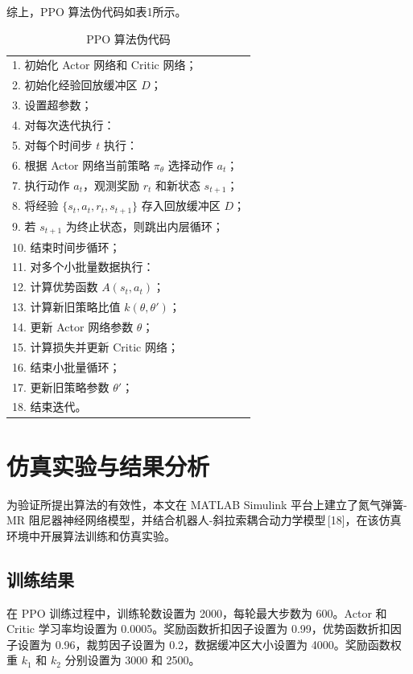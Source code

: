 \documentclass[12pt,a4paper]{ctexart}
\begin{document}
综上，PPO 算法伪代码如表1所示。

\begin{longtable}{p{}}
\caption{PPO 算法伪代码}\\
\toprule
1. 初始化 Actor 网络和 Critic 网络；\\
2. 初始化经验回放缓冲区 $D$；\\
3. 设置超参数；\\
4. 对每次迭代执行：\\
5. \quad 对每个时间步 $t$ 执行：\\
6. \quad\quad 根据 Actor 网络当前策略 $\pi_\theta$ 选择动作 $a_t$；\\
7. \quad\quad 执行动作 $a_t$，观测奖励 $r_t$ 和新状态 $s_{t+1}$；\\
8. \quad\quad 将经验 $\{s_t,a_t,r_t,s_{t+1}\}$ 存入回放缓冲区 $D$；\\
9. \quad\quad 若 $s_{t+1}$ 为终止状态，则跳出内层循环；\\
10. \quad 结束时间步循环；\\
11. \quad 对多个小批量数据执行：\\
12. \quad\quad 计算优势函数 $A(s_t,a_t)$；\\
13. \quad\quad 计算新旧策略比值 $k(\theta,\theta')$；\\
14. \quad\quad 更新 Actor 网络参数 $\theta$；\\
15. \quad\quad 计算损失并更新 Critic 网络；\\
16. \quad 结束小批量循环；\\
17. \quad 更新旧策略参数 $\theta'$；\\
18. 结束迭代。\\
\bottomrule
\end{longtable}

\section{仿真实验与结果分析}
为验证所提出算法的有效性，本文在 MATLAB Simulink 平台上建立了氮气弹簧-MR 阻尼器神经网络模型，并结合机器人-斜拉索耦合动力学模型\,[18]，在该仿真环境中开展算法训练和仿真实验。

\subsection{训练结果}
在 PPO 训练过程中，训练轮数设置为 2000，每轮最大步数为 600。Actor 和 Critic 学习率均设置为 0.0005。奖励函数折扣因子设置为 0.99，优势函数折扣因子设置为 0.96，裁剪因子设置为 0.2，数据缓冲区大小设置为 4000。奖励函数权重 $k_1$ 和 $k_2$ 分别设置为 3000 和 2500。
\end{document}
